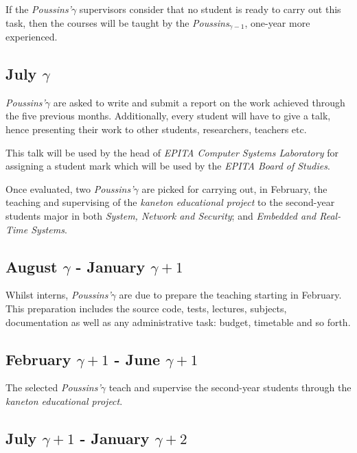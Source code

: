 \begin{multicols}{2}
If the \textit{Poussins'$\gamma$} supervisors consider that no student is
ready to carry out this task, then the courses will be taught by the
\textit{Poussins$_{\gamma - 1}$}, one-year more experienced.

%
%

\subsection{July $\gamma$}

\textit{Poussins'$\gamma$} are asked to write and submit a report on the
work achieved through the five previous months. Additionally, every student
will have to give a talk, hence presenting their work to other students,
researchers, teachers etc.

This talk will be used by the head of \textit{EPITA Computer Systems
Laboratory} for assigning a student mark which will be used by the
\textit{EPITA Board of Studies}.

Once evaluated, two \textit{Poussins'$\gamma$} are picked for carrying out,
in February, the teaching and supervising of the \textit{kaneton educational
project} to the second-year students major in both \textit{System, Network and
Security}; and \textit{Embedded and Real-Time Systems}.

%
%

\subsection{August $\gamma$ - January $\gamma + 1$}

Whilst interns, \textit{Poussins'$\gamma$} are due to prepare the teaching
starting in February. This preparation includes the source code, tests,
lectures, subjects, documentation as well as any administrative task: budget,
timetable and so forth.

%
%

\subsection{February $\gamma + 1$ - June $\gamma + 1$}

The selected \textit{Poussins'$\gamma$} teach and supervise the second-year
students through the \textit{kaneton educational project}.

%
%

\subsection{July $\gamma + 1$ - January $\gamma + 2$}


\end{multicols}
